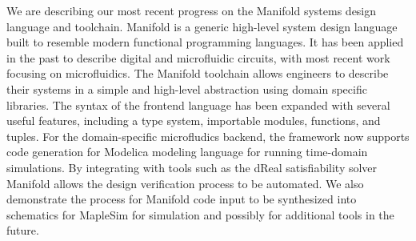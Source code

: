 We are describing our most recent progress on the Manifold systems design language and toolchain.
Manifold is a generic high-level system design language built to resemble modern functional programming languages.
It has been applied in the past to describe digital and microfluidic circuits, with most recent work focusing on microfluidics.
The Manifold toolchain allows engineers to describe their systems in a simple and high-level abstraction using domain specific libraries.
The syntax of the frontend language has been expanded with several useful features, including a type system, importable modules, functions, and tuples.
For the domain-specific microfludics backend, the framework now supports code generation for Modelica modeling language for running time-domain simulations.
By integrating with tools such as the dReal satisfiability solver Manifold allows the design verification process to be automated.
We also demonstrate the process for Manifold code input to be synthesized into schematics for MapleSim for simulation and possibly for additional tools in the future.